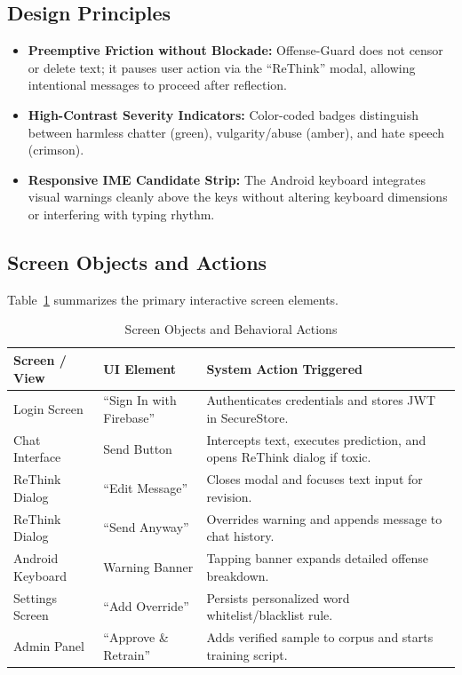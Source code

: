 \documentclass[A4paper,12pt]{report}
\theoremstyle{plain}
\theoremstyle{definition}
\theoremstyle{remark}
\numberwithin{equation}{section}
\begin{document}
\subsection{Design Principles}
\begin{itemize}[leftmargin=*]
    \item \textbf{Preemptive Friction without Blockade:} Offense-Guard does not censor or delete text; it pauses user action via the ``ReThink'' modal, allowing intentional messages to proceed after reflection.
    \item \textbf{High-Contrast Severity Indicators:} Color-coded badges distinguish between harmless chatter (green), vulgarity/abuse (amber), and hate speech (crimson).
    \item \textbf{Responsive IME Candidate Strip:} The Android keyboard integrates visual warnings cleanly above the keys without altering keyboard dimensions or interfering with typing rhythm.
\end{itemize}

\subsection{Screen Objects and Actions}
Table~\ref{tab:ui_actions} summarizes the primary interactive screen elements.

\begin{table}[H]
\centering
\caption{Screen Objects and Behavioral Actions}
\label{tab:ui_actions}
\renewcommand{\arraystretch}{1.3}
\begin{tabular}{|p{3.5cm}|p{3.5cm}|p{7.5cm}|}
\hline
\textbf{Screen / View} & \textbf{UI Element} & \textbf{System Action Triggered} \\ \hline
Login Screen & ``Sign In with Firebase'' & Authenticates credentials and stores JWT in SecureStore. \\ \hline
Chat Interface & Send Button & Intercepts text, executes prediction, and opens ReThink dialog if toxic. \\ \hline
ReThink Dialog & ``Edit Message'' & Closes modal and focuses text input for revision. \\ \hline
ReThink Dialog & ``Send Anyway'' & Overrides warning and appends message to chat history. \\ \hline
Android Keyboard & Warning Banner & Tapping banner expands detailed offense breakdown. \\ \hline
Settings Screen & ``Add Override'' & Persists personalized word whitelist/blacklist rule. \\ \hline
Admin Panel & ``Approve \& Retrain'' & Adds verified sample to corpus and starts training script. \\ \hline
\end{tabular}
\end{table}
\end{document}
